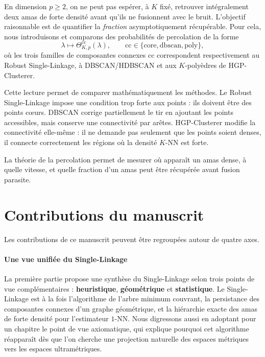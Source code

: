 En dimension $p\geq2$, on ne peut pas espérer, à $K$ fixé, retrouver intégralement deux amas de forte densité avant qu'ils ne fusionnent avec le bruit. 
L'objectif raisonnable est de quantifier la \emph{fraction} asymptotiquement récupérable. Pour cela, nous introduisons et comparons des probabilités de percolation de la forme
\[
    \lambda
    \longmapsto
    \Theta^{\mathrm{cc}}_{K,p}(\lambda),
    \qquad
    \mathrm{cc}\in
    \{\mathrm{core},\mathrm{dbscan},\mathrm{poly}\},
\]
où les trois familles de composantes connexes $\mathrm{cc}$ correspondent respectivement au Robust Single-Linkage, à DBSCAN/HDBSCAN et aux $K$-polyèdres de HGP-Clusterer.

Cette lecture permet de comparer mathématiquement les méthodes. Le Robust Single-Linkage impose une condition trop forte aux points : ils doivent être des points cœurs. 
DBSCAN corrige partiellement le tir en ajoutant les points accessibles, mais conserve une connectivité par arêtes. 
HGP-Clusterer modifie la connectivité elle-même : il ne demande pas seulement que les points soient denses, il connecte correctement les régions où la densité $K$-NN est forte.

La théorie de la percolation permet de mesurer où apparaît un amas dense, à quelle vitesse, et quelle fraction d'un amas peut être récupérée avant fusion parasite. 

\section{Contributions du manuscrit}

Les contributions de ce manuscrit peuvent être regroupées autour de quatre axes.

\paragraph{Une vue unifiée du Single-Linkage}
La première partie propose une synthèse du Single-Linkage selon trois points de vue complémentaires : \textbf{heuristique}, \textbf{géométrique} et \textbf{statistique}.
Le Single-Linkage est à la fois l'algorithme de l'arbre minimum couvrant, la persistance des composantes connexes d'un graphe géométrique, et la hiérarchie exacte des amas de forte densité pour l'estimateur $1$-NN. 
Nous digressons aussi en adoptant pour un chapitre le point de vue axiomatique, qui explique pourquoi cet algorithme réapparaît dès que l'on cherche une projection naturelle des espaces métriques vers les espaces ultramétriques.

